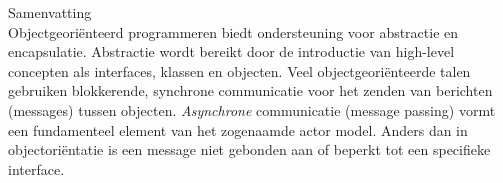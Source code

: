 \vspace*{20mm}

{Samenvatting}\label{sec:abstract-diff} \\
Objectgeoriënteerd programmeren biedt ondersteuning voor abstractie en encapsulatie.
Abstractie wordt bereikt door de introductie van high-level concepten als interfaces,
klassen en objecten.
Veel objectgeoriënteerde talen gebruiken blokkerende, synchrone communicatie voor het zenden van berichten (messages) tussen objecten.
\emph{Asynchrone} communicatie (message passing) vormt een fundamenteel element van het zogenaamde actor model.
Anders dan in objectoriëntatie is een message niet gebonden aan of beperkt tot een specifieke interface.

